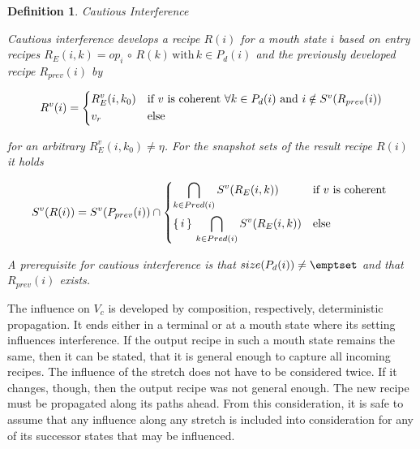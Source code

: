 \documentclass[12pt,a4paper]{scrartcl}
\newtheorem{definition}{Definition}
\begin{document}
\begin{definition} Cautious Interference

    Cautious interference develops a recipe $R(i)$ for a mouth state $i$ 
    based on entry recipes $R_E(i,k) =
    op_i\,\circ\,R(k)\,\mbox{with}\,k \in P_d(i)$ and the previously developed
    recipe $R_{prev}(i)$ by 

    \begin{equation} \label{eq:opt-interference-output}
        R^v(i) = 
        \begin{dcases*}
            R_E^v(i,k_0) & if $v$ is coherent $\forall  k\in P_d(i)$ and $i\notin S^v(R_{prev}(i))$\\
            v_r         & else
        \end{dcases*}
    \end{equation}

    for an arbitrary $R_E^v(i,k_0)\neq\eta$. For the snapshot sets of the
    result recipe $R(i)$ it holds

    \begin{equation} \label{eq:interference-snapshot-sets}
        S^v(R(i)) = S^v(P_{prev}(i)) \cap
        \begin{dcases*}
            \bigcap_{k\in Pred(i)} S^v(R_E(i,k))            & if $v$ is coherent \\
            \{\,i\,\}\,\bigcap_{k\in Pred(i)} S^v(R_E(i,k)) & else \\
        \end{dcases*}
    \end{equation}

    A prerequisite for cautious interference is that $size(P_d(i)) \neq
    \emptset$ and that $R_{prev}(i)$ exists.

\end{definition}

The influence on $V_c$ is developed by composition, respectively,
deterministic propagation. It ends either in a terminal or at a mouth state
where its setting influences interference. If the output recipe in such a mouth
state remains the same, then it can be stated, that it is general enough to
capture all incoming recipes. The influence of the stretch does not have to be
considered twice. If it changes, though, then the output recipe was not general
enough. The new recipe must be propagated along its paths ahead.  From this
consideration, it is safe to assume that any influence along any stretch is
included into consideration for any of its successor states that may be
influenced.
\end{document}
